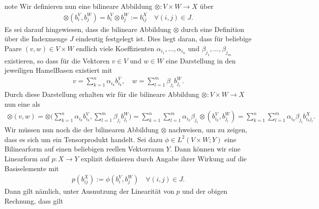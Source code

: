 \documentclass[letterpaper,10pt,german]{jupyterBook}
\begin{document}
\begin{sphinxadmonition}{note}
\sphinxAtStartPar
Wir definieren nun eine bilineare Abbildung \(\otimes: V\times W \to X\) über
\begin{equation*}
\begin{split}\otimes (b_i^V, b_j^W) = b_i^V \otimes b_j^W := b_{ij}^X \quad \forall (i,j)\in J.\end{split}
\end{equation*}
\sphinxAtStartPar
Es sei darauf hingewiesen, dass die bilineare Abbildung \(\otimes\) durch eine Definition über die Indexmenge \(J\) eindeutig festgelegt ist.
Dies liegt daran, dass für beliebige Paare \((v,w)\in V\times W\) endlich viele Koeffizienten \(\alpha_{i_1},\ldots,\alpha_{i_n}\) und \(\beta_{j_1},\ldots, \beta_{j_m}\) existieren, so dass für die Vektoren \(v \in V\) und \(w \in W\) eine Darstellung in den jeweiligen Hamel\sphinxhyphen{}Basen existiert mit
\begin{equation*}
\begin{split}v = \sum_{k=1}^n \alpha_{i_k} b_{i_k}^V, \quad w = \sum_{l=1}^m \beta_{j_l} b_{j_l}^W.\end{split}
\end{equation*}
\sphinxAtStartPar
Durch diese Darstellung erhalten wir für die bilineare Abbildung \(\otimes: V\times W \to X\) nun eine  als
\begin{equation*}
\begin{split}\otimes(v,w) 
= 
\otimes\big(\sum_{k=1}^n \alpha_{i_k} b_{i_k}^V, \sum_{l=1}^m \beta_{j_l} b_{j_l}^W\big) = 
\sum_{k=1}^n \sum_{l=1}^m \alpha_{i_k} \beta_{j_l} \otimes\left(b_{i_k}^V, b_{j_l}^W\right) =
\sum_{k=1}^n \sum_{l=1}^m \alpha_{i_k} \beta_{j_l} b_{i_kj_l}^X.\end{split}
\end{equation*}
\sphinxAtStartPar
Wir müssen nun noch die  der bilinearen Abbildung \(\otimes\) nachweisen, um zu zeigen, dass es sich um ein Tensorprodukt handelt.
Sei dazu \(\phi\in L^2(V\times W; Y)\) eine Bilinearform auf einen beliebigen reellen Vektorraum \(Y\).
Dann können wir eine Linearform auf \(p: X\to Y\) explizit definieren durch Angabe ihrer Wirkung auf die Basiselemente mit
\begin{equation*}
\begin{split}p(b_{ij}^X) := \phi(b_i^V, b_j^W) \quad \forall (i,j) \in J.\end{split}
\end{equation*}
\sphinxAtStartPar
Dann gilt nämlich, unter Ausnutzung der Linearität von \(p\) und der obigen Rechnung, dass gilt

\end{sphinxadmonition}
\end{document}
